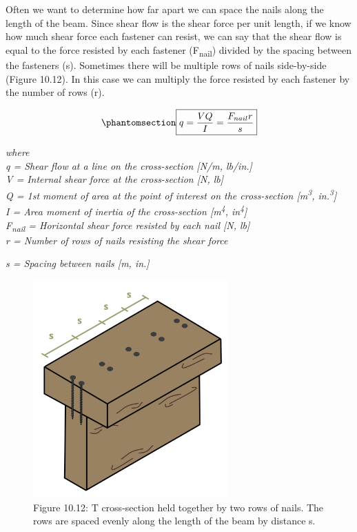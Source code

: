 \documentclass[
  letterpaper,
  DIV=11,
  numbers=noendperiod]{scrreprt}
\theoremstyle{definition}
\theoremstyle{remark}
\begin{document}
Often we want to determine how far apart we can space the nails along
the length of the beam. Since shear flow is the shear force per unit
length, if we know how much shear force each fastener can resist, we can
say that the shear flow is equal to the force resisted by each fastener
(F\textsubscript{nail}) divided by the spacing between the fasteners
(s). Sometimes there will be multiple rows of nails side-by-side (Figure
10.12). In this case we can multiply the force resisted by each fastener
by the number of rows (r).

\begin{equation}\phantomsection\label{eq-10.3}{
\boxed{q=\frac{V Q}{I}=\frac{F_{nail} r}{s}}
}\end{equation}

\emph{where}\\
\emph{q = Shear flow at a line on the cross-section {[}N/m, lb/in.{]}}\\
\emph{V = Internal shear force at the cross-section {[}N, lb{]}}\\
\emph{Q = 1st moment of area at the point of interest on the
cross-section {[}m\textsuperscript{3}, in.\textsuperscript{3}{]}}\\
\emph{I = Area moment of inertia of the cross-section
{[}m\textsuperscript{4}, in\textsuperscript{4}{]}}\\
\emph{F\textsubscript{nail} = Horizontal shear force resisted by each
nail {[}N, lb{]}}\\
\emph{r = Number of rows of nails resisting the shear force}

\emph{s = Spacing between nails {[}m, in.{]}}

\begin{figure}[H]

{\centering \includegraphics[width=2.9375in,height=\textheight]{images/CH10 PNGs/figure 10.12.png}

}

\caption{Figure 10.12: T cross-section held together by two rows of
nails. The rows are spaced evenly along the length of the beam by
distance s.}

\end{figure}%
\end{document}
